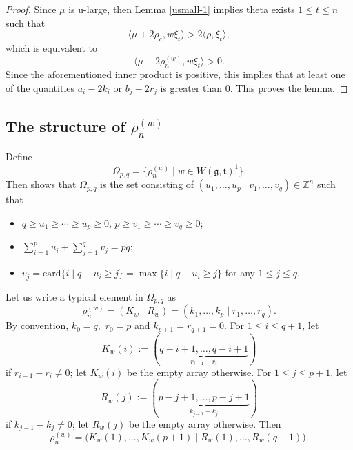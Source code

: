 \documentclass[11pt]{amsart}
\theoremstyle{plain}
\theoremstyle{definition}
\newcommand{\frg}{\mathfrak{g}}
\newcommand{\frt}{\mathfrak{t}}
\newcommand{\bbZ}{\mathbb{Z}}
\begin{document}
\begin{proof}
	Since $\mu$ is u-large, then Lemma \ref{usmall-1}  implies theta exists $1\le t\le n$ such that
$$
\langle \mu+2\rho_c, w\xi_t\rangle>2\langle \rho, \xi_t\rangle,
$$
which is equivalent to
\[\langle\mu-2\rho_n^{(w)}, w\xi_t\rangle>0.\]
	Since the aforementioned inner product is positive, this implies that at least one of the quantities $a_i-2k_i$ or $b_j-2r_j$ is greater than $0$. This proves the lemma.
\end{proof}
\subsection{The structure of $\rho_n^{(w)}$}
Define
\[\Omega_{p,q}=\{\rho_n^{(w)}\mid w\in W(\frg,\frt)^1\}.\]
Then \cite{DY} shows that $\Omega_{p,q}$ is the set consisting of $(u_1,\dots,u_p\mid v_1,\dots,v_q)\in \bbZ^n$ such that
\begin{itemize}
	\item[(a)] $q\ge u_1\ge\cdots\ge u_p\ge 0$, $p\ge v_1\ge\cdots\ge v_q\ge 0$;
	\item[(b)] $\sum\limits_{i=1}^p u_i+\sum\limits_{j=1}^q v_j=pq$;
	\item[(c)] $v_j=\mathrm{card}\{i\mid q-u_i\ge j\}=\max\{i\mid q-u_i\ge j\}$ for any $1\le j\le q$.
\end{itemize}

Let us write a typical element in $\Omega_{p,q}$ as
\begin{equation}\label{rho-n-w}
\rho_n^{(w)}=(K_w\mid R_w)=(k_1,\dots,k_p\mid r_1,\dots,r_q).
\end{equation}
By convention, $k_0=q$,\ $r_0=p$ and $k_{p+1}=r_{q+1}=0$. For $1\le i\le q+1$, let
\[K_w(i):=(\underbrace{q-i+1,\dots,q-i+1}_{r_{i-1}-r_i})\]
if $r_{i-1}-r_i\neq 0$; let $K_w(i)$ be the empty array otherwise. For $1\le j\le p+1$, let
\[R_w(j):=(\underbrace{p-j+1,\dots,p-j+1}_{k_{j-1}-k_j})\]
if $k_{j-1}-k_j\neq 0$; let $R_w(j)$ be the empty array otherwise. Then
\[\rho_n^{(w)}=\big(K_w(1),\dots,K_w(p+1)\mid R_w(1),\dots,R_w(q+1)\big).\]
\end{document}
